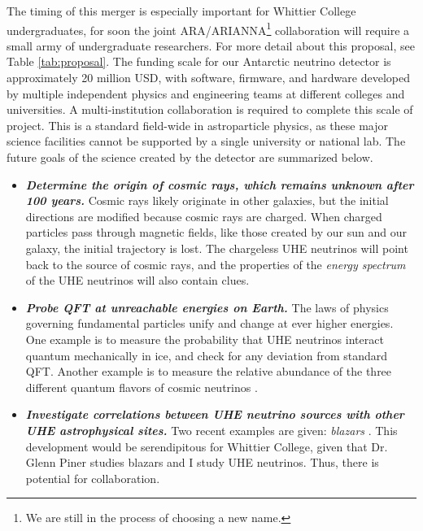 \documentclass[../../main.tex]{subfiles}
\begin{document}
The timing of this merger is especially important for Whittier College undergraduates, for soon the joint ARA/ARIANNA\footnote{We are still in the process of choosing a new name.} collaboration will require a small army of undergraduate researchers.  For more detail about this proposal, see Table \ref{tab:proposal}.  The funding scale for our Antarctic neutrino detector is approximately 20 million USD, with software, firmware, and hardware developed by multiple independent physics and engineering teams at different colleges and universities.  A multi-institution collaboration is required to complete this scale of project.  This is a standard field-wide in astroparticle physics, as these major science facilities cannot be supported by a single university or national lab.  The future goals of the science created by the detector are summarized below. \\ \hspace{0.1cm}

\begin{itemize}
\item \textbf{\textit{Determine the origin of cosmic rays, which remains unknown after 100 years.}}  Cosmic rays likely originate in other galaxies, but the initial directions are modified because cosmic rays are charged.  When charged particles pass through magnetic fields, like those created by our sun and our galaxy, the initial trajectory is lost. The chargeless UHE neutrinos will point back to the source of cosmic rays, and the properties of the \textit{energy spectrum} of the UHE neutrinos will also contain clues.
\item \textbf{\textit{Probe QFT at unreachable energies on Earth.}}  The laws of physics governing fundamental particles unify and change at ever higher energies.  One example is to measure the probability that UHE neutrinos interact quantum mechanically in ice, and check for any deviation from standard QFT. Another example is to measure the relative abundance of the three different quantum flavors of cosmic neutrinos \cite{bustamante2017measurement} \cite{connolly2011calculation}. 
\item \textit{\textbf{Investigate correlations between UHE neutrino sources with other UHE astrophysical sites.}}  Two recent examples are given: \textit{blazars} \cite{eaat2890}.  This development would be serendipitous for Whittier College, given that Dr. Glenn Piner studies blazars \cite{piner2018multiepoch} and I study UHE neutrinos. Thus, there is potential for collaboration.
\end{itemize}
\end{document}
